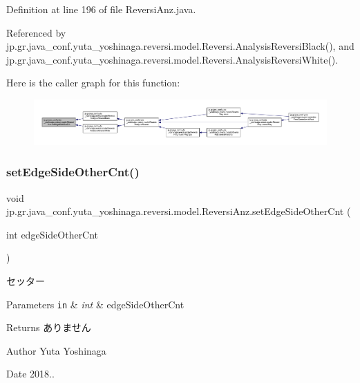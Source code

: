 Definition at line 196 of file Reversi\+Anz.\+java.



Referenced by jp.\+gr.\+java\+\_\+conf.\+yuta\+\_\+yoshinaga.\+reversi.\+model.\+Reversi.\+Analysis\+Reversi\+Black(), and jp.\+gr.\+java\+\_\+conf.\+yuta\+\_\+yoshinaga.\+reversi.\+model.\+Reversi.\+Analysis\+Reversi\+White().

Here is the caller graph for this function\+:
\nopagebreak
\begin{figure}[H]
\begin{center}
\leavevmode
\includegraphics[width=350pt]{classjp_1_1gr_1_1java__conf_1_1yuta__yoshinaga_1_1reversi_1_1model_1_1_reversi_anz_a126130b697a4306e782a539c8cea0a56_icgraph}
\end{center}
\end{figure}
\mbox{\label{classjp_1_1gr_1_1java__conf_1_1yuta__yoshinaga_1_1reversi_1_1model_1_1_reversi_anz_a00da6644a1ea7ef66e51eb08a4fa8177}} 
\subsubsection{\texorpdfstring{set\+Edge\+Side\+Other\+Cnt()}{setEdgeSideOtherCnt()}}
{\footnotesize\ttfamily void jp.\+gr.\+java\+\_\+conf.\+yuta\+\_\+yoshinaga.\+reversi.\+model.\+Reversi\+Anz.\+set\+Edge\+Side\+Other\+Cnt (\begin{DoxyParamCaption}\item[{int}]{edge\+Side\+Other\+Cnt }\end{DoxyParamCaption})}



セッター 


\begin{DoxyParams}[1]{Parameters}
\mbox{\tt in}  & {\em int} & edge\+Side\+Other\+Cnt \\
\hline
\end{DoxyParams}
\begin{DoxyReturn}{Returns}
ありません 
\end{DoxyReturn}
\begin{DoxyAuthor}{Author}
Yuta Yoshinaga 
\end{DoxyAuthor}
\begin{DoxyDate}{Date}
2018.. 
\end{DoxyDate}


